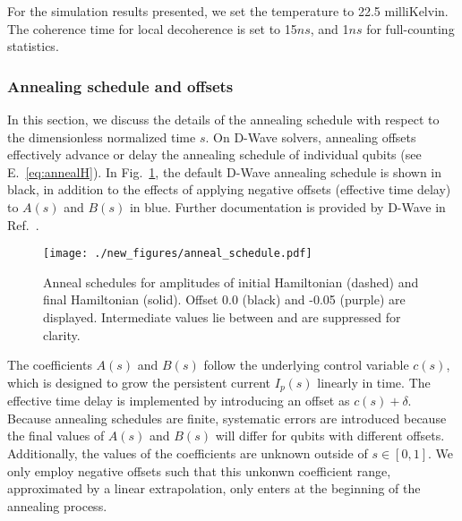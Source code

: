 \documentclass[prd,twocolumn,tightenlines,preprintnumbers,showpacs,superscriptaddress,notitlepage,nofootinbib,eqsecnum,floatfix,longbibliography,aps,10pt]{revtex4-2}
\begin{document}
For the simulation results presented, we set the temperature to 22.5 milliKelvin.
The coherence time for local decoherence is set to 15$ns$, and 1$ns$ for full-counting statistics.

\subsubsection{Annealing schedule and offsets}
\label{sec:methods:annealing-schedule}
In this section, we discuss the details of the annealing schedule with respect to the dimensionless normalized time $s$.
On D-Wave solvers, annealing offsets effectively advance or delay the annealing schedule of individual qubits (see E.~\eqref{eq:annealH}).
In Fig.~\ref{fig:anneal_schedule}, the default D-Wave annealing schedule is shown in black, in addition to the effects of applying negative offsets (effective time delay) to $A(s)$ and $B(s)$ in blue.
Further documentation is provided by D-Wave in Ref.~\cite{dwave_as, dwave_as_docu}.

\begin{figure}[htb]
 \centering
  \texttt{[image: ./new\_figures/anneal\_schedule.pdf]}
  \caption{
  Anneal schedules for amplitudes of initial Hamiltonian (dashed) and final Hamiltonian (solid).
  Offset 0.0 (black) and -0.05 (purple) are displayed.
  Intermediate values lie between and are suppressed for clarity.
 }
 \label{fig:anneal_schedule}
\end{figure}

The coefficients $A(s)$ and $B(s)$ follow the underlying control variable $c(s)$, which is designed to grow the persistent current $I_p(s)$ linearly in time.
The effective time delay is implemented by introducing an offset as $c(s) + \delta$.
Because annealing schedules are finite, systematic errors are introduced because the final values of $A(s)$ and $B(s)$ will differ for qubits with different offsets.
Additionally, the values of the coefficients are unknown outside of $s\in [0, 1]$.
We only employ negative offsets such that this unkonwn coefficient range, approximated by a linear extrapolation, only enters at the beginning of the annealing process.
\end{document}
